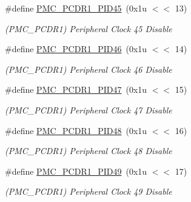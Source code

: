 \begin{DoxyCompactItemize}
\mbox{\label{group__SAME70__PMC_ga836ea506c5b2bd2110a515564f989232}} 
\#define \mbox{\hyperlink{group__SAME70__PMC_ga836ea506c5b2bd2110a515564f989232}{P\+M\+C\+\_\+\+P\+C\+D\+R1\+\_\+\+P\+I\+D45}}~(0x1u $<$$<$ 13)
\begin{DoxyCompactList}\small\item\em (P\+M\+C\+\_\+\+P\+C\+D\+R1) Peripheral Clock 45 Disable \end{DoxyCompactList}\item 
\mbox{\label{group__SAME70__PMC_ga597041ea11a6404f635cd6ec7ebe3fee}} 
\#define \mbox{\hyperlink{group__SAME70__PMC_ga597041ea11a6404f635cd6ec7ebe3fee}{P\+M\+C\+\_\+\+P\+C\+D\+R1\+\_\+\+P\+I\+D46}}~(0x1u $<$$<$ 14)
\begin{DoxyCompactList}\small\item\em (P\+M\+C\+\_\+\+P\+C\+D\+R1) Peripheral Clock 46 Disable \end{DoxyCompactList}\item 
\mbox{\label{group__SAME70__PMC_ga3cc4b2e7791a7ea64566ff7b440994f1}} 
\#define \mbox{\hyperlink{group__SAME70__PMC_ga3cc4b2e7791a7ea64566ff7b440994f1}{P\+M\+C\+\_\+\+P\+C\+D\+R1\+\_\+\+P\+I\+D47}}~(0x1u $<$$<$ 15)
\begin{DoxyCompactList}\small\item\em (P\+M\+C\+\_\+\+P\+C\+D\+R1) Peripheral Clock 47 Disable \end{DoxyCompactList}\item 
\mbox{\label{group__SAME70__PMC_ga7f62bb05429b3a59e986799ab0e41e35}} 
\#define \mbox{\hyperlink{group__SAME70__PMC_ga7f62bb05429b3a59e986799ab0e41e35}{P\+M\+C\+\_\+\+P\+C\+D\+R1\+\_\+\+P\+I\+D48}}~(0x1u $<$$<$ 16)
\begin{DoxyCompactList}\small\item\em (P\+M\+C\+\_\+\+P\+C\+D\+R1) Peripheral Clock 48 Disable \end{DoxyCompactList}\item 
\mbox{\label{group__SAME70__PMC_gacdeac0f755374592760006417379d589}} 
\#define \mbox{\hyperlink{group__SAME70__PMC_gacdeac0f755374592760006417379d589}{P\+M\+C\+\_\+\+P\+C\+D\+R1\+\_\+\+P\+I\+D49}}~(0x1u $<$$<$ 17)
\begin{DoxyCompactList}\small\item\em (P\+M\+C\+\_\+\+P\+C\+D\+R1) Peripheral Clock 49 Disable \end{DoxyCompactList}\item 
$$
\end{DoxyCompactItemize}
